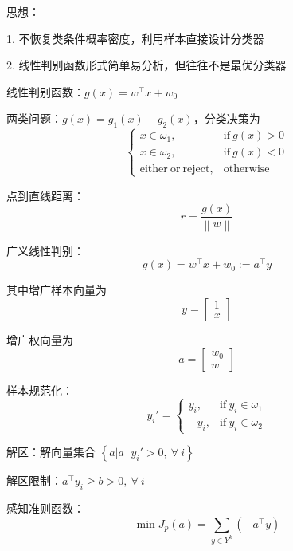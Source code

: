 \documentclass[openany]{ctexbook}
\theoremstyle{kaiti}
\theoremstyle{normal}
\begin{document}
思想：

1. 不恢复类条件概率密度，利用样本直接设计分类器

2. 线性判别函数形式简单易分析，但往往不是最优分类器

线性判别函数：$g(x)=w^{\top}x+w_0$

两类问题：$g(x)=g_1(x)-g_2(x)$，分类决策为
\begin{equation}
\begin{cases}
  x\in \omega_1, &\mathrm{if}~g(x)>0\\
  x\in \omega_2, &\mathrm{if}~g(x)<0\\
  \mathrm{either}~\mathrm{or}~\mathrm{reject}, &\mathrm{otherwise}
\end{cases}
\end{equation}

点到直线距离：
\begin{equation}
r=\frac{g(x)}{\left\| w \right\|}
\end{equation}

广义线性判别：
\begin{equation}
g(x)=w^{\top}x+w_0:=a^{\top}y
\end{equation}

其中增广样本向量为 
\begin{equation}
y=\begin{bmatrix}
  1\\ x
\end{bmatrix}
\end{equation}

增广权向量为 
\begin{equation}
a=\begin{bmatrix}
  w_0\\ w
\end{bmatrix}
\end{equation}

样本规范化：
\begin{equation}
y_{i}'=
\begin{cases}
  y_i, & \mathrm{if}~y_i\in \omega_1\\
  -y_i, & \mathrm{if}~y_i\in \omega_2
\end{cases}
\end{equation}

解区：解向量集合 $\left\{ a|a^{\top}y_{i}'>0,~\forall~i \right\}$

解区限制：$a^{\top}y_i\geqslant b>0,~\forall~i$

感知准则函数：
\begin{equation}
\min J_p\left(a \right)=\sum_{y\in Y^k}\left(-a^{\top}y \right)
\end{equation}
\end{document}
